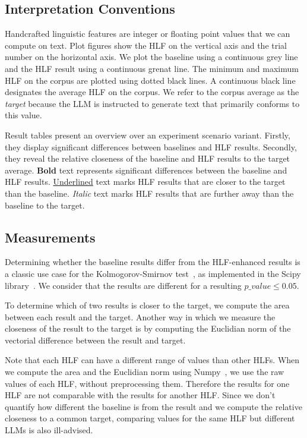 \documentclass[11pt]{article}
\begin{document}
\subsection{Interpretation Conventions}

Handcrafted linguistic features are integer or floating point values that we
can compute on text.
Plot figures show the HLF on the vertical axis and the trial number on the horizontal
axis.
We plot the baseline using a continuous grey line and the HLF result using a
continuous grenat line.
The minimum and maximum HLF on the corpus are plotted using dotted black lines.
A continuous black line designates the average HLF on the corpus.
We refer to the corpus average as the \textit{target} because the LLM is
instructed to generate text that primarily conforms to this value.

Result tables present an overview over an experiment scenario variant.
Firstly, they display significant differences between baselines and HLF results.
Secondly, they reveal the relative closeness of the baseline and HLF results to
the target average.
\textbf{Bold} text represents significant differences between the baseline and
HLF results.
\underline{Underlined} text marks HLF results that are closer to the target than
the baseline.
\textit{Italic} text marks HLF results that are further away than the baseline
to the target.

\subsection{Measurements}\label{subsec:measurements}

Determining whether the baseline results differ from the HLF-enhanced results is
a classic use case for the Kolmogorov-Smirnov
test~\cite{kolmogorov1933,smirnov1939}, as implemented in the
Scipy library~\cite{2020SciPy-NMeth}.
We consider that the results are different for a resulting $p\_value \le 0.05$.

To determine which of two results is closer to the target, we compute the area
between each result and the target.
Another way in which we measure the closeness of the result to the target is by
computing the Euclidian norm of the vectorial difference between the result and
target.

Note that each HLF can have a different range of values than other HLFs.
When we compute the area and the Euclidian norm using Numpy~\cite{harris2020array},
we use the raw values of each HLF, without preprocessing them.
Therefore the results for one HLF are not comparable with the results for
another HLF.\@
Since we don't quantify how different the baseline is from the result and we
compute the relative closeness to a common target, comparing values for the same
HLF but different LLMs is also ill-advised.
\end{document}
